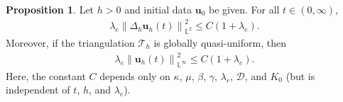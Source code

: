 \documentclass[11pt, reqno]{amsart}
\theoremstyle{definition}
\newtheorem{proposition}[theorem]{Proposition}
\theoremstyle{remark}
\numberwithin{equation}{section}
\newcommand{\cal}{\mathcal}
\newcommand{\bff}{\boldsymbol}
\newcommand{\bb}{\mathbb}
\newcommand{\norm}[2]{\left\|{#1}\right\|_{#2}}
\newcommand{\inpro}[2]{\left\langle#1,#2\right\rangle}
\begin{document}


\begin{proposition}\label{pro:semidisc est3}
Let $h>0$ and initial data $\bff{u}_0$ be given. For all $t\in (0,\infty)$,
\begin{align}\label{equ:semidisc-est lapl}
	\lambda_e \norm{\Delta_h \bff{u}_h(t)}{\bb{L}^2}^2
	\leq 
	C(1+\lambda_e).
\end{align}
Moreover, if the triangulation $\cal{T}_h$ is globally quasi-uniform, then
\begin{align}\label{equ:semidisc-est L infty}
	\lambda_e \norm{\bff{u}_h(t)}{\bb{L}^\infty}^2
	\leq 
	C(1+\lambda_e).
\end{align}
Here, the constant $C$ depends only on $\kappa$, $\mu$, $\beta$, $\gamma$, $\lambda_r$, $\mathscr{D}$, and $K_0$ (but is independent of $t$, $h$, and $\lambda_e$).
\end{proposition}
\end{document}
